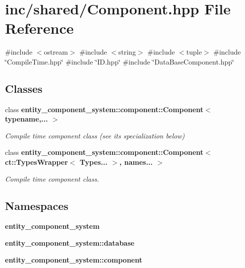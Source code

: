 \section{inc/shared/\+Component.hpp File Reference}
\label{_component_8hpp}
{\ttfamily \#include $<$ostream$>$}\newline
{\ttfamily \#include $<$string$>$}\newline
{\ttfamily \#include $<$tuple$>$}\newline
{\ttfamily \#include \char`\"{}Compile\+Time.\+hpp\char`\"{}}\newline
{\ttfamily \#include \char`\"{}I\+D.\+hpp\char`\"{}}\newline
{\ttfamily \#include \char`\"{}Data\+Base\+Component.\+hpp\char`\"{}}\newline
\subsection*{Classes}
\begin{DoxyCompactItemize}
\item 
class {\bf entity\+\_\+component\+\_\+system\+::component\+::\+Component$<$ typename,... $>$}
\begin{DoxyCompactList}\small\item\em Compile time component class (see its specialization below) \end{DoxyCompactList}\item 
class {\bf entity\+\_\+component\+\_\+system\+::component\+::\+Component$<$ ct\+::\+Types\+Wrapper$<$ Types... $>$, names... $>$}
\begin{DoxyCompactList}\small\item\em Compile time component class. \end{DoxyCompactList}\end{DoxyCompactItemize}
\subsection*{Namespaces}
\begin{DoxyCompactItemize}
\item 
 {\bf entity\+\_\+component\+\_\+system}
\item 
 {\bf entity\+\_\+component\+\_\+system\+::database}
\item 
 {\bf entity\+\_\+component\+\_\+system\+::component}
\end{DoxyCompactItemize}

